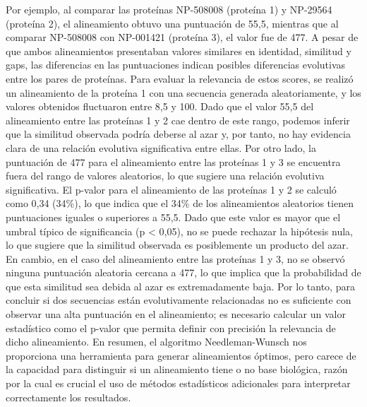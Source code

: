 Por ejemplo, al comparar las proteínas NP-508008 (proteína 1) y NP-29564 (proteína 2), el alineamiento obtuvo una puntuación de 55,5, mientras que al comparar NP-508008 con NP-001421 (proteína 3), el valor fue de 477. A pesar de que ambos alineamientos presentaban valores similares en identidad, similitud y gaps, las diferencias en las puntuaciones indican posibles diferencias evolutivas entre los pares de proteínas. Para evaluar la relevancia de estos scores, se realizó un alineamiento de la proteína 1 con una secuencia generada aleatoriamente, y los valores obtenidos fluctuaron entre 8,5 y 100. Dado que el valor 55,5 del alineamiento entre las proteínas 1 y 2 cae dentro de este rango, podemos inferir que la similitud observada podría deberse al azar y, por tanto, no hay evidencia clara de una relación evolutiva significativa entre ellas. Por otro lado, la puntuación de 477 para el alineamiento entre las proteínas 1 y 3 se encuentra fuera del rango de valores aleatorios, lo que sugiere una relación evolutiva significativa. El p-valor para el alineamiento de las proteínas 1 y 2 se calculó como 0,34 (34\%), lo que indica que el 34\% de los alineamientos aleatorios tienen puntuaciones iguales o superiores a 55,5. Dado que este valor es mayor que el umbral típico de significancia (p < 0,05), no se puede rechazar la hipótesis nula, lo que sugiere que la similitud observada es posiblemente un producto del azar. En cambio, en el caso del alineamiento entre las proteínas 1 y 3, no se observó ninguna puntuación aleatoria cercana a 477, lo que implica que la probabilidad de que esta similitud sea debida al azar es extremadamente baja. Por lo tanto, para concluir si dos secuencias están evolutivamente relacionadas no es suficiente con observar una alta puntuación en el alineamiento; es necesario calcular un valor estadístico como el p-valor que permita definir con precisión la relevancia de dicho alineamiento. En resumen, el algoritmo Needleman-Wunsch nos proporciona una herramienta para generar alineamientos óptimos, pero carece de la capacidad para distinguir si un alineamiento tiene o no base biológica, razón por la cual es crucial el uso de métodos estadísticos adicionales para interpretar correctamente los resultados.
